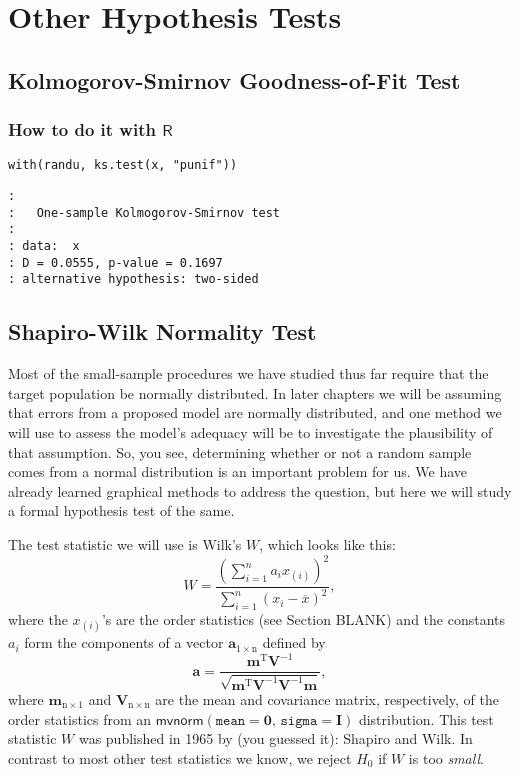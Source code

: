 \section{Other Hypothesis Tests}
\label{sec-10-5}

\subsection{Kolmogorov-Smirnov Goodness-of-Fit Test}
\label{sec-10-5-1}

\subsubsection{How to do it with \(\mathsf{R}\)}
\label{sec-10-5-1-1}

\begin{verbatim}
with(randu, ks.test(x, "punif"))
\end{verbatim}

\begin{verbatim}
: 
: 	One-sample Kolmogorov-Smirnov test
: 
: data:  x
: D = 0.0555, p-value = 0.1697
: alternative hypothesis: two-sided
\end{verbatim}

\subsection{Shapiro-Wilk Normality Test}
\label{sec-10-5-2}

Most of the small-sample procedures we have studied thus far require
that the target population be normally distributed.  In later chapters
we will be assuming that errors from a proposed model are normally
distributed, and one method we will use to assess the model's adequacy
will be to investigate the plausibility of that assumption. So, you
see, determining whether or not a random sample comes from a normal
distribution is an important problem for us.  We have already learned
graphical methods to address the question, but here we will study a
formal hypothesis test of the same.

The test statistic we will use is Wilk's \(W\), which looks like this:
\begin{equation}
W = \frac{\left(\sum_{i = 1}^{n} a_{i}x_{(i)} \right)^{2}}{\sum_{i = 1}^{n}(x_{i} - \overline{x})^{2}},
\end{equation}
where the \(x_{(i)}\)'s are the order statistics (see Section BLANK)
and the constants \(a_{i}\) form the components of a vector
\(\mathbf{a}_{1\times\mathrm{n}}\) defined by
\begin{equation}
\mathbf{a}=\frac{\mathbf{m}^{\mathrm{T}}\mathbf{V}^{-1}}{\sqrt{\mathbf{m}^{\mathrm{T}}\mathbf{V}^{-1}\mathbf{V}^{-1}\mathbf{m}}},
\end{equation}
where \(\mathbf{m}_{\mathrm{n}\times1}\) and \(\mathbf{V}_{\mathrm{n}
\times \mathrm{n}} \) are the mean and covariance matrix,
respectively, of the order statistics from an \(\mathsf{mvnorm}
\left(\mathtt{mean} = \mathbf{0},\,\mathtt{sigma} =
\mathbf{I}\right)\) distribution.  This test statistic \(W\) was
published in 1965 by (you guessed it): Shapiro and
Wilk\cite{Wilk1965}.  In contrast to most other test statistics we
know, we reject \(H_{0}\) if \(W\) is too \emph{small}.

